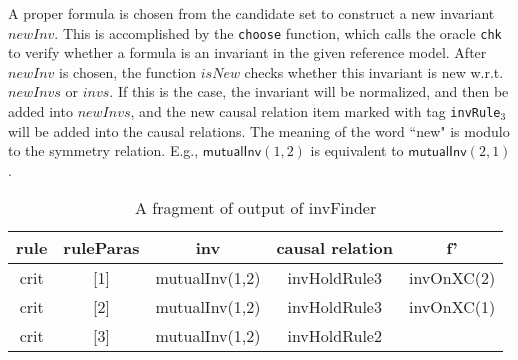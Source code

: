\documentclass[conference]{IEEEtran}
\def \eqc {\doteq }
\def \andc {\barwedge }
\def \negc {!}
\begin{document}
{\begin{description}[leftmargin=0pt,noitemsep,nolistsep]
A proper formula is chosen from the candidate set to construct a new invariant $newInv$. This is accomplished by the {\tt choose} function, which calls the oracle {\tt chk} to verify whether a formula is an invariant in the given reference model. After $newInv$ is chosen, the function $isNew$ checks whether this invariant is new w.r.t. $newInvs$ or $invs$. If this is the case, the invariant will be normalized, and then be  added into $newInvs$, and the new causal relation item marked with tag {\tt invRule$_3$} will be added into the causal relations. The meaning of the word ``new" is modulo to the symmetry relation. E.g., $\mathsf{mutualInv}(1,2)$ is equivalent to
$\mathsf{mutualInv}(2,1)$. %


\end{description}


\vspace{-5pt}
 \begin{table}[htbp]
\centering \caption{A fragment of output of {\sf invFinder}\label{table:groundCausalRelation}} %
\vspace{-8pt}
\begin{tabular}{|c|c|c|c|c|  }
\hline
  rule& ruleParas&inv&causal relation &   f'  \\
\hline

  crit  & [1]&mutualInv(1,2)& invHoldRule3 &invOnXC(2) \\
\hline
  crit &[2]& mutualInv(1,2)& invHoldRule3 &invOnXC(1)  \\
\hline
  crit & [3]& mutualInv(1,2) & invHoldRule2  & \\
\hline


\end{tabular}
\end{table}}
\end{document}
